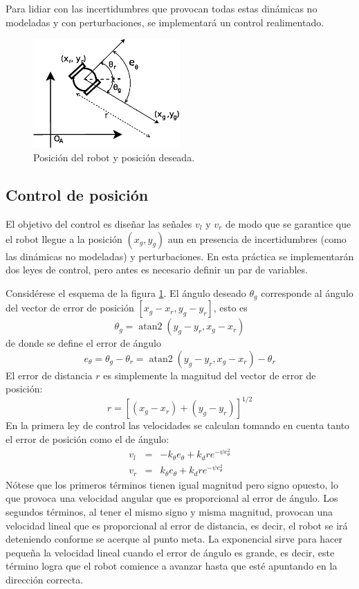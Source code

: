 \documentclass[letterpaper,12pt]{article}
\DeclareMathOperator{\atantwo}{atan2}
\begin{document}
Para lidiar con las incertidumbres que provocan todas estas dinámicas no modeladas y con perturbaciones, se implementará un control realimentado.
\begin{figure}
\centering
\includegraphics[width=0.5\textwidth]{Figures/GoalPose.eps}
\caption{Posición del robot y posición deseada.}
\label{fig:Coords}
\end{figure}

\subsection{Control de posición}
El objetivo del control es diseñar las señales $v_l$ y $v_r$ de modo que se garantice que el robot llegue a la posición $\left(x_g, y_g\right)$ aun en presencia de incertidumbres (como las dinámicas no modeladas) y perturbaciones. En esta práctica se implementarán dos leyes de control, pero antes es necesario definir un par de variables. 

Considérese el esquema de la figura \ref{fig:Coords}. El ángulo deseado $\theta_g$ corresponde al ángulo del vector de error de posición $\left[x_g - x_r, y_g - y_r\right]$, esto es
\[\theta_g = \atantwo\left(y_g - y_r, x_g - x_r\right)\]
de donde se define el error de ángulo
\[e_{\theta} = \theta_g - \theta_r = \atantwo\left(y_g - y_r, x_g - x_r\right) - \theta_r\]
El error de distancia $r$ es simplemente la magnitud del vector de error de posición:
\[r= \left[\left(x_g - x_r\right) + \left(y_g - y_r\right)\right]^{1/2}\]
En la primera ley de control las velocidades se calculan tomando en cuenta tanto el error de posición como el de ángulo:
\begin{eqnarray}
v_{l} &=& -k_{\theta}e_{\theta} + k_d r e^{-\psi e_{\theta}^2}\label{eq:Control11}\\
v_{r} &=&  k_{\theta}e_{\theta} + k_d r e^{-\psi e_{\theta}^2}\label{eq:Control12}
\end{eqnarray}
Nótese que los primeros términos tienen igual magnitud pero signo opuesto, lo que provoca una velocidad angular que es proporcional al error de ángulo. Los segundos términos, al tener el mismo signo y misma magnitud, provocan una velocidad lineal que es proporcional al error de distancia, es decir, el robot se irá deteniendo conforme se acerque al punto meta. La exponencial sirve para hacer pequeña la velocidad lineal cuando el error de ángulo es grande, es decir, este término logra que el robot comience a avanzar hasta que esté apuntando en la dirección correcta.
\end{document}
